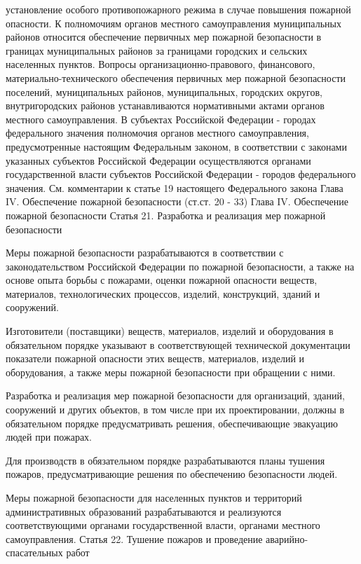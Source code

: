 \documentclass[a4paper, 12pt]{article}
\theoremstyle{definition}
\begin{document}
        установление особого противопожарного режима в случае повышения пожарной опасности.
        К полномочиям органов местного самоуправления муниципальных районов относится обеспечение первичных мер пожарной безопасности в границах муниципальных районов за границами городских и сельских населенных пунктов.
        Вопросы организационно-правового, финансового, материально-технического обеспечения первичных мер пожарной безопасности поселений, муниципальных районов, муниципальных, городских округов, внутригородских районов устанавливаются нормативными актами органов местного самоуправления.
        В субъектах Российской Федерации - городах федерального значения полномочия органов местного самоуправления, предусмотренные настоящим Федеральным законом, в соответствии с законами указанных субъектов Российской Федерации осуществляются органами государственной власти субъектов Российской Федерации - городов федерального значения.
        См. комментарии к статье 19 настоящего Федерального закона
        Глава IV. Обеспечение пожарной безопасности (ст.ст. 20 - 33)
        Глава IV. Обеспечение пожарной безопасности
        Статья 21. Разработка и реализация мер пожарной безопасности

        Меры пожарной безопасности разрабатываются в соответствии с законодательством Российской Федерации по пожарной безопасности, а также на основе опыта борьбы с пожарами, оценки пожарной опасности веществ, материалов, технологических процессов, изделий, конструкций, зданий и сооружений.

        Изготовители (поставщики) веществ, материалов, изделий и оборудования в обязательном порядке указывают в соответствующей технической документации показатели пожарной опасности этих веществ, материалов, изделий и оборудования, а также меры пожарной безопасности при обращении с ними.

        Разработка и реализация мер пожарной безопасности для организаций, зданий, сооружений и других объектов, в том числе при их проектировании, должны в обязательном порядке предусматривать решения, обеспечивающие эвакуацию людей при пожарах.

        Для производств в обязательном порядке разрабатываются планы тушения пожаров, предусматривающие решения по обеспечению безопасности людей.

        Меры пожарной безопасности для населенных пунктов и территорий административных образований разрабатываются и реализуются соответствующими органами государственной власти, органами местного самоуправления.
        Статья 22. Тушение пожаров и проведение аварийно-спасательных работ
\end{document}
